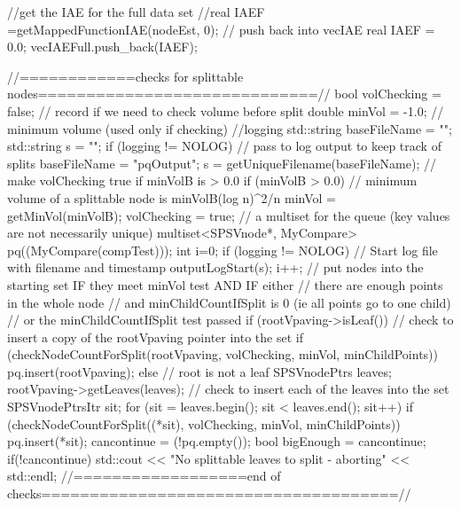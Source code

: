 \begin{DoxyCode}
{{      //get the IAE for the full data set
      //real IAEF =getMappedFunctionIAE(nodeEst, 0);
      // push back into vecIAE 
      real IAEF = 0.0;
      vecIAEFull.push_back(IAEF);

    //============checks  for splittable nodes=============================//
        bool volChecking = false; // record if we need to check volume before
       split
        double minVol = -1.0; // minimum volume (used only if checking)
        //logging
        std::string baseFileName = "";
        std::string s = "";
        if (logging != NOLOG) {
            // pass to log output to keep track of splits
            baseFileName = "pqOutput";
            s = getUniqueFilename(baseFileName);
        }
        // make volChecking true if minVolB is > 0.0
        if (minVolB > 0.0) {
            // minimum volume of a splittable node is minVolB(log n)^2/n
            minVol = getMinVol(minVolB);
            volChecking = true;
        }
      // a multiset for the queue (key values are not necessarily unique)
      multiset<SPSVnode*, MyCompare> pq((MyCompare(compTest)));
      int i=0;
      if (logging != NOLOG) {
             // Start log file with filename and timestamp
            outputLogStart(s);    
            i++;
      }
      // put nodes into the starting set IF they meet minVol test AND IF either
      // there are enough points in the whole node
      // and minChildCountIfSplit is 0 (ie all points go to one child)
      // or the minChildCountIfSplit test passed
        if (rootVpaving->isLeaf()) {
            // check to insert a copy of the rootVpaving pointer into the set
           if (checkNodeCountForSplit(rootVpaving, volChecking, minVol,
                minChildPoints)) {
                    pq.insert(rootVpaving);
            }
        }
        else { // root is not a leaf
            SPSVnodePtrs leaves;
            rootVpaving->getLeaves(leaves);
            // check to insert each of the leaves into the set
            SPSVnodePtrsItr sit;            
            for (sit = leaves.begin(); sit < leaves.end(); sit++) {
                if (checkNodeCountForSplit((*sit), volChecking, minVol,
                minChildPoints)) {
               pq.insert(*sit);
                }
            }
        }
        cancontinue = (!pq.empty());
        bool bigEnough = cancontinue;
        if(!cancontinue) {
            std::cout << "No splittable leaves to split - aborting" << 
      std::endl;
        }        
        //==================end of
       checks=====================================//
  
}}
\end{DoxyCode}
